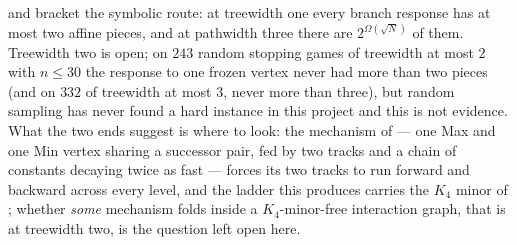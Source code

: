 \begin{remark}\label{wa:dividing}
 and  bracket the symbolic route: at
treewidth one every branch response has at most two affine pieces, and at
pathwidth three there are $2^{\Omega(\sqrt N)}$ of them. Treewidth two is open;
on $243$ random stopping games of treewidth at most $2$ with $n\le30$ the
response to one frozen vertex never had more than two pieces (and on $332$ of
treewidth at most $3$, never more than three), but random sampling has never
found a hard instance in this project and this is not evidence. What the two
ends suggest is where to look: the mechanism of  --- one Max and
one Min vertex sharing a successor pair, fed by two tracks and a chain of
constants decaying twice as fast --- forces its two tracks to run forward and
backward across every level, and the ladder this produces carries the $K_4$
minor of ; whether \emph{some} mechanism folds inside a
$K_4$-minor-free interaction graph, that is at treewidth two, is the question
left open here.
\end{remark}